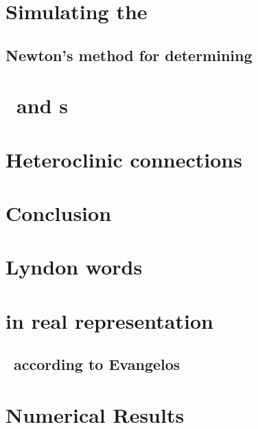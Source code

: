 \documentclass[hyperref]{inputs/gatech-thesis}
\begin{document}

\chapter{Simulating the \KSe}
\label{chap:Numerics}
    \section{Newton's method for determining \reqva}
        


\chapter{\Eqva\ and \po s}

\chapter{Heteroclinic connections}

\chapter{Conclusion}



\appendix

\chapter{Lyndon words}


\chapter{\KSe in real representation}

\section{\KSe\ according to Evangelos}


\chapter{Numerical Results}

         \PublicPrivate{
         }{ %
%  
         } %

\begin{postliminary}
{}
\begin{vita}
    
\end{vita}
\end{postliminary}
\end{document}
